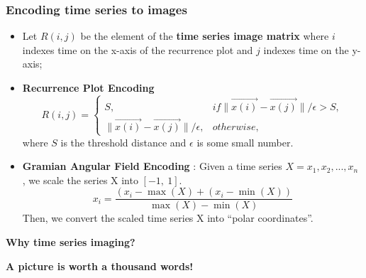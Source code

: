 \documentclass[10pt,aspectratio=43]{beamer}
\begin{document}
\begin{frame}
  \frametitle{Encoding time series to images}

  \begin{itemize}
  \item Let $R(i,j)$ be the element of the \textbf{time series image matrix} where $i$
    indexes time on the x-axis of the recurrence plot and $j$ indexes time on the y-axis;
  \item  \textbf{Recurrence Plot Encoding}
\begin{equation*}
  R(i, j) = \begin{cases}
    S, & if \parallel \overrightarrow{x(i)} -\overrightarrow{x(j)}\parallel/\epsilon>S,\\
    \parallel \overrightarrow{x(i)} -\overrightarrow{x(j)}\parallel/\epsilon, & otherwise,
  \end{cases}
\end{equation*}
  where $S$ is the threshold distance and $\epsilon$ is some small number.

\item \textbf{Gramian Angular Field Encoding} \citep{wang2015Imaging}: Given a time series
  $X={x_{1},x_{2},...,x_{n}}$ , we scale the series X into $[-1,~1]$.
\begin{equation*}
 { x } _ { i } = \frac { \left( x _ { i } - \max ( X ) + \left( x _ { i } - \min ( X ) \right) \right. } { \max ( X ) - \min ( X ) }
\end{equation*}
Then, we convert the scaled time series X into ``polar coordinates''.

  \end{itemize}

\end{frame}


\begin{frame}[plain]

  \begin{center}
    {\Huge \color{SUblue} \textbf{Why time series imaging?}}
  \end{center}

\end{frame}


\begin{frame}[plain]

  \begin{center}
    {\huge \color{purple} \textbf{A picture is worth a thousand words!}}
  \end{center}

\end{frame}
\end{document}
